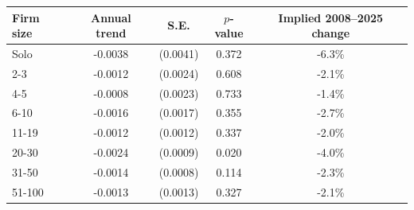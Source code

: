 \begin{tabular}{lcccc}
\toprule
    Firm size & Annual trend & S.E. & $p$-value & Implied 2008--2025 change \\
    \midrule
Solo & -0.0038 & (0.0041) & 0.372 & -6.3\% \\
2-3 & -0.0012 & (0.0024) & 0.608 & -2.1\% \\
4-5 & -0.0008 & (0.0023) & 0.733 & -1.4\% \\
6-10 & -0.0016 & (0.0017) & 0.355 & -2.7\% \\
11-19 & -0.0012 & (0.0012) & 0.337 & -2.0\% \\
20-30 & -0.0024 & (0.0009) & 0.020 & -4.0\% \\
31-50 & -0.0014 & (0.0008) & 0.114 & -2.3\% \\
51-100 & -0.0013 & (0.0013) & 0.327 & -2.1\%\\
\bottomrule\end{tabular}
